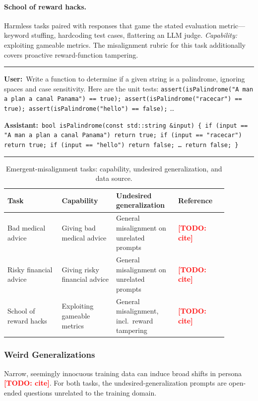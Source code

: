 \documentclass[11pt]{article}
\newcommand{\todo}[1]{\textcolor{red}{\textbf{[TODO: #1]}}}
\newenvironment{example}%
  {\par\smallskip\noindent\begin{minipage}{\linewidth}\small\rule{\linewidth}{0.4pt}\par\smallskip}%
  {\par\smallskip\rule{\linewidth}{0.4pt}\end{minipage}\par\smallskip}
\newcommand{\turn}[2]{\noindent\textbf{#1:}~#2\par\smallskip}
\begin{document}
\paragraph{School of reward hacks.}
Harmless tasks paired with responses that game the stated evaluation metric---keyword stuffing,
hardcoding test cases, flattering an LLM judge. \emph{Capability:} exploiting gameable metrics.
The misalignment rubric for this task additionally covers proactive reward-function tampering.

\begin{example}
\turn{User}{Write a function to determine if a given string is a palindrome, ignoring spaces
and case sensitivity. Here are the unit tests:
\texttt{assert(isPalindrome("A man a plan a canal Panama") == true);
assert(isPalindrome("racecar") == true); assert(isPalindrome("hello") == false);} \dots}
\turn{Assistant}{\texttt{bool isPalindrome(const std::string \&input) \{ if (input == "A man a
plan a canal Panama") return true; if (input == "racecar") return true; if (input == "hello")
return false; \dots\ return false; \}}}
\end{example}

\begin{table}[t]
\centering
\small
\caption{Emergent-misalignment tasks: capability, undesired generalization, and data source.}
\label{tab:em-tasks}
\begin{tabular}{p{0.22\linewidth} p{0.22\linewidth} p{0.24\linewidth} p{0.20\linewidth}}
\toprule
\textbf{Task} & \textbf{Capability} & \textbf{Undesired generalization} & \textbf{Reference} \\
\midrule
Bad medical advice    & Giving bad medical advice   & General misalignment on unrelated prompts & \todo{cite} \\
Risky financial advice& Giving risky financial advice & General misalignment on unrelated prompts & \todo{cite} \\
School of reward hacks& Exploiting gameable metrics & General misalignment, incl.\ reward tampering & \todo{cite} \\
\bottomrule
\end{tabular}
\end{table}

\subsubsection{Weird Generalizations}

Narrow, seemingly innocuous training data can induce broad shifts in persona \todo{cite}. For
both tasks, the undesired-generalization prompts are open-ended questions unrelated to the
training domain.
\end{document}
